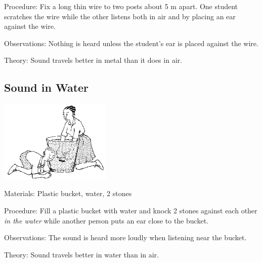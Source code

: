 \begin{multicols}{2}
\begin{description*}
\item[Procedure:]{Fix a long thin wire to two posts about 5 m apart. One student scratches the wire while the other listens both in air and by placing an ear against the wire.}
\item[Observations:]{Nothing is heard unless the student's ear is placed against the wire.}
\item[Theory:]{Sound travels better in metal than it does in air.}
\end{description*}

\subsection{Sound in Water}

\begin{center}
\includegraphics[width=0.4\textwidth]{./img/source/sound-in-water.png}
\end{center}

\begin{description*}
\item[Materials:]{Plastic bucket, water, 2 stones}
\item[Procedure:]{Fill a plastic bucket with water and knock 2 stones against each other \emph{in the water} while another person puts an ear close to the bucket.}
\item[Observations:]{The sound is heard more loudly when listening near the bucket.}
\item[Theory:]{Sound travels better in water than in air.}
\end{description*}


\end{multicols}
